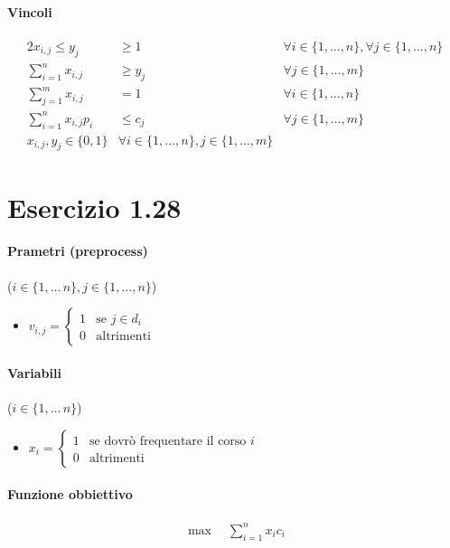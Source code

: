 \documentclass{article}
\begin{document}
\paragraph{Vincoli}
\begin{alignat}{2}
  x_{i,j} \leq y_j &\geq 1 &\forall i \in \{1,\ldots,n\}, \forall j \in \{1,\ldots,n\} \\
  \sum_{i=1}^n x_{i,j} &\geq y_j &\forall j \in \{1,\ldots,m\} \\
  \sum_{j=1}^m x_{i,j} &=1  &\forall i \in \{1,\ldots,n\} \\
  \sum_{i=1}^n x_{i,j} p_i &\leq c_j  &\forall j \in \{1,\ldots,m\} \\
  x_{i,j}, y_j \in \{0,1\} &\forall i \in \{1,\ldots,n\}, j \in \{1,\ldots,m\}
\end{alignat}

\pagebreak
\section{Esercizio 1.28}

\paragraph{Prametri (preprocess)} ($i \in \{1,\ldots\,n\}, j \in \{1,\ldots,n\}$)
\begin{itemize}
  \item $v_{i,j} = \begin{cases}
      1 & \text{se }j \in d_i \\
      0 & \text{altrimenti}
  \end{cases}$
\end{itemize}

\paragraph{Variabili} ($i \in \{1,\ldots\,n\}$)
\begin{itemize}
  \item $x_i = \begin{cases}
      1 & \text{se dovr\`o frequentare il corso }i\\
      0 & \text{altrimenti}
  \end{cases}$
\end{itemize}

\paragraph{Funzione obbiettivo}
\begin{align*}
  \max \quad \sum_{i=1}^n x_i c_i
\end{align*}
\end{document}
